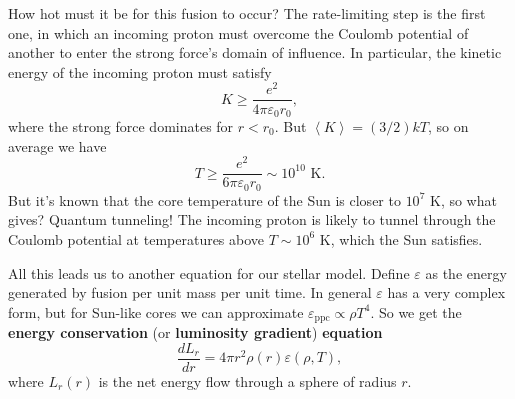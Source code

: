 \documentclass[../a062main.tex]{subfiles}
\begin{document}
How hot must it be for this fusion to occur?
The rate-limiting step is the first one, in which an incoming proton must overcome the Coulomb potential of another to enter the strong force's domain of influence.
In particular, the kinetic energy of the incoming proton must satisfy
\[ K \geq \frac{e^2}{4\pi \varepsilon_0 r_0}, \]
where the strong force dominates for $r < r_0$.
But $\left< K \right> = (3/2) kT$, so on average we have
\[ T \geq \frac{e^2}{6\pi \varepsilon_0 r_0} \sim 10^{10} \textrm{ K}. \]
But it's known that the core temperature of the Sun is closer to $10^{7} \textrm{ K}$, so what gives?
Quantum tunneling!
The incoming proton is likely to tunnel through the Coulomb potential at temperatures above $T \sim 10^{6} \text{ K}$, which the Sun satisfies.

All this leads us to another equation for our stellar model.
Define $\varepsilon$ as the energy generated by fusion per unit mass per unit time.
In general $\varepsilon$ has a very complex form, but for Sun-like cores we can approximate $\varepsilon_\textrm{ppc} \propto \rho T^{4}$.
So we get the \textbf{energy conservation} (or \textbf{luminosity gradient}) \textbf{equation}
\[ \boxed{\frac{dL_r}{dr} = 4\pi r^2 \rho(r) \varepsilon(\rho, T)}, \]
where $L_r(r)$ is the net energy flow through a sphere of radius $r$.
\end{document}
